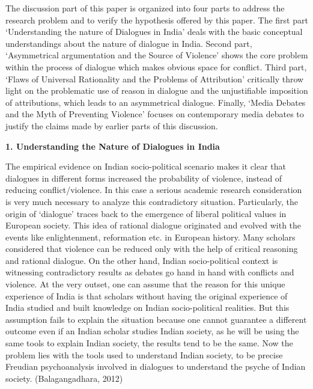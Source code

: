 \begin{multicols}{2}
\noi
The discussion part of this paper is organized into four parts to address the research problem and
to verify the hypothesis offered by this paper. The first part ‘Understanding the nature of
Dialogues in India’ deals with the basic conceptual understandings about the nature of dialogue
in India. Second part, ‘Asymmetrical argumentation and the Source of Violence’ shows the core
problem within the process of dialogue which makes obvious space for conflict. Third part, ‘Flaws
of Universal Rationality and the Problems of Attribution’ critically throw light on the problematic
use of reason in dialogue and the unjustifiable imposition of attributions, which leads to an
asymmetrical dialogue. Finally, ‘Media Debates and the Myth of Preventing Violence’ focuses
on contemporary media debates to justify the claims made by earlier parts of this discussion.

\noi
{\large \bfseries 1. Understanding the Nature of Dialogues in India}

\noi
The empirical evidence on Indian socio-political scenario makes it clear that dialogues in different
forms increased the probability of violence, instead of reducing conflict/violence. In this case a
serious academic research consideration is very much necessary to analyze this contradictory
situation. Particularly, the origin of ‘dialogue’ traces back to the emergence of liberal political
values in European society. This idea of rational dialogue originated and evolved with the events
like enlightenment, reformation etc. in European history. Many scholars considered that violence
can be reduced only with the help of critical reasoning and rational dialogue. On the other hand,
Indian socio-political context is witnessing contradictory results as debates go hand in hand with
conflicts and violence. At the very outset, one can assume that the reason for this unique
experience of India is that scholars without having the original experience of India studied and
built knowledge on Indian socio-political realities. But this assumption fails to explain the
situation because one cannot guarantee a different outcome even if an Indian scholar studies
Indian society, as he will be using the same tools to explain Indian society, the results tend to be
the same. Now the problem lies with the tools used to understand Indian society, to be precise Freudian psychoanalysis involved in dialogues to understand the psyche of Indian society.
(Balagangadhara, 2012)


\end{multicols}
